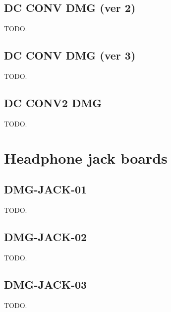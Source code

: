 \subsection{DC CONV DMG (ver 2)}

TODO.

\subsection{DC CONV DMG (ver 3)}

TODO.

\subsection{DC CONV2 DMG}

TODO.

\section{Headphone jack boards}

\subsection{DMG-JACK-01}

TODO.

\subsection{DMG-JACK-02}

TODO.

\subsection{DMG-JACK-03}

TODO.
